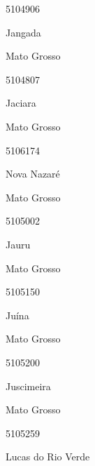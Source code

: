 \documentclass[
  letterpaper,
]{report}
\begin{document}
5104906

\n      

Jangada

\n    

\n    

\n      

Mato Grosso

\n      

5104807

\n      

Jaciara

\n    

\n    

\n      

Mato Grosso

\n      

5106174

\n      

Nova Nazaré

\n    

\n    

\n      

Mato Grosso

\n      

5105002

\n      

Jauru

\n    

\n    

\n      

Mato Grosso

\n      

5105150

\n      

Juína

\n    

\n    

\n      

Mato Grosso

\n      

5105200

\n      

Juscimeira

\n    

\n    

\n      

Mato Grosso

\n      

5105259

\n      

Lucas do Rio Verde

\n    

\n    
\end{document}
